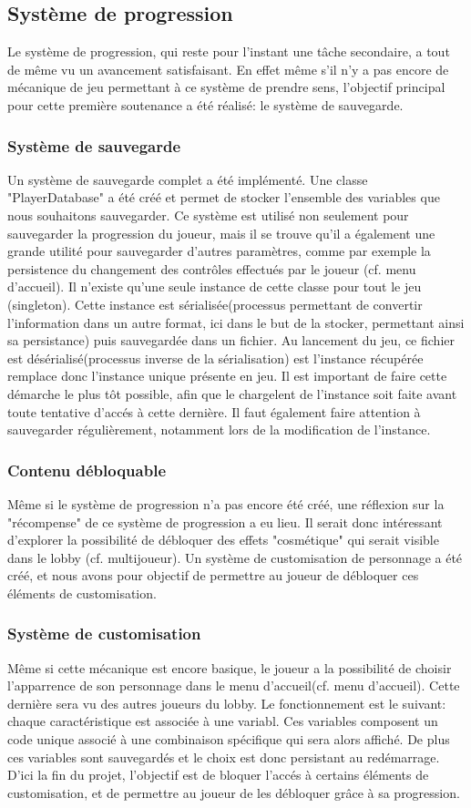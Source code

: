 \subsection{Système de progression}
    Le système de progression, qui reste pour l'instant une tâche secondaire, a tout de même vu un avancement satisfaisant. En effet même s'il n'y a pas encore de mécanique de jeu permettant à ce système de prendre sens, l'objectif principal pour cette première soutenance a été réalisé: le système de sauvegarde.
    \subsubsection{Système de sauvegarde}
    Un système de sauvegarde complet a été implémenté. Une classe "PlayerDatabase" a été créé et permet de stocker l'ensemble des variables que nous souhaitons sauvegarder. Ce système est utilisé non seulement pour sauvegarder la progression du joueur, mais il se trouve qu'il a également une grande utilité pour sauvegarder d'autres paramètres, comme par exemple la persistence du changement des contrôles effectués par le joueur (cf. menu d'accueil). Il n'existe qu'une seule instance de cette classe pour tout le jeu (singleton). Cette instance est sérialisée(processus permettant de convertir l'information dans un autre format, ici dans le but de la stocker, permettant ainsi sa persistance) puis sauvegardée dans un fichier. Au lancement du jeu, ce fichier est désérialisé(processus inverse de la sérialisation) est l'instance récupérée remplace donc l'instance unique présente en jeu. Il est important de faire cette démarche le plus tôt possible, afin que le chargelent de l'instance soit faite avant toute tentative d'accés à cette dernière. Il faut également faire attention à sauvegarder régulièrement, notamment lors de la modification de l'instance. 
    \subsubsection{Contenu débloquable}
    Même si le système de progression n'a pas encore été créé, une réflexion sur la "récompense" de ce système de progression a eu lieu. Il serait donc intéressant d'explorer la possibilité de débloquer des effets "cosmétique" qui serait visible dans le lobby (cf. multijoueur). Un système de customisation de personnage a été créé, et nous avons pour objectif de permettre au joueur de débloquer ces éléments de customisation.
    \subsubsection{Système de customisation}
    Même si cette mécanique est encore basique, le joueur a la possibilité de choisir l'apparrence de son personnage dans le menu d'accueil(cf. menu d'accueil). Cette dernière sera vu des autres joueurs du lobby. Le fonctionnement est le suivant: chaque caractéristique est associée à une variabl. Ces variables composent un code unique associé à une combinaison spécifique qui sera alors affiché. De plus ces variables sont sauvegardés et le choix est donc persistant au redémarrage. D'ici la fin du projet, l'objectif est de bloquer l'accés à certains éléments de customisation, et de permettre au joueur de les débloquer grâce à sa progression.